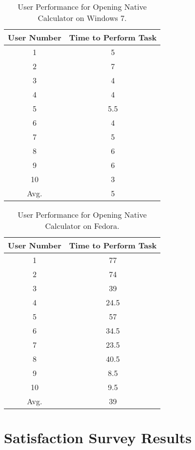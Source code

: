 \documentclass[11pt,letterpaper]{report}
\begin{document}
\begin{table}
    \centering
    \begin{tabular}{| c | c |}
        \hline
        User Number & Time to Perform Task \\ \hline
        1 & 5 \\  \hline
        2 & 7 \\  \hline
        3 & 4 \\ \hline
        4 & 4 \\  \hline
        5 & 5.5 \\    \hline
        6 & 4 \\  \hline
        7 & 5 \\ \hline
        8 & 6 \\  \hline
        9 & 6 \\ \hline
        10 & 3 \\ \hline
        Avg. & 5 \\
        \hline
    \end{tabular}
    \caption{User Performance for Opening Native Calculator on Windows 7.}
    \label{calcW}    
\end{table}

\begin{table}
    \centering
    \begin{tabular}{| c | c |}
        \hline
        User Number & Time to Perform Task \\ \hline
        1 & 77 \\  \hline
        2 & 74 \\  \hline
        3 & 39 \\ \hline
        4 & 24.5 \\  \hline
        5 & 57 \\    \hline
        6 & 34.5 \\  \hline
        7 & 23.5 \\ \hline
        8 & 40.5 \\  \hline
        9 & 8.5 \\ \hline
        10 & 9.5 \\ \hline
        Avg. & 39 \\
        \hline
    \end{tabular}
    \caption{User Performance for Opening Native Calculator on Fedora.}
    \label{calcL}    
\end{table}


\section{Satisfaction Survey Results}
\end{document}
